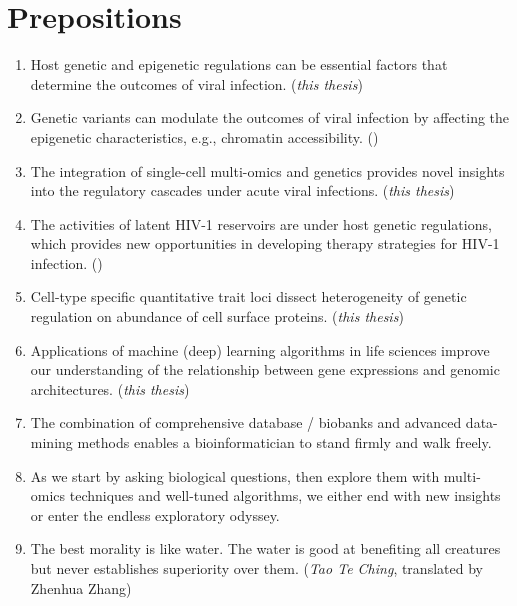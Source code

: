 \documentclass[15pt,usletter,fancy]{src/phdthesis}
\begin{document}
\chapter*{Prepositions}

\begin{enumerate}
  \item Host genetic and epigenetic regulations can be essential factors that determine the outcomes of viral infection. (\textit{this thesis})
  \item Genetic variants can modulate the outcomes of viral infection by affecting the epigenetic characteristics, e.g., chromatin accessibility. ()
  \item The integration of single-cell multi-omics and genetics provides novel insights into the regulatory cascades under acute viral infections. (\textit{this thesis})
  \item The activities of latent HIV-1 reservoirs are under host genetic regulations, which provides new opportunities in developing therapy strategies for HIV-1 infection. ()
  \item Cell-type specific quantitative trait loci dissect heterogeneity of genetic regulation on abundance of cell surface proteins. (\textit{this thesis})
  \item Applications of machine (deep) learning algorithms in life sciences improve our understanding of the relationship between gene expressions and genomic architectures. (\textit{this thesis})
  \item The combination of comprehensive database / biobanks and advanced data-mining methods enables a bioinformatician to stand firmly and walk freely.
  \item As we start by asking biological questions, then explore them with multi-omics techniques and well-tuned algorithms, we either end with new insights or enter the endless exploratory odyssey.
  \item The best morality is like water. The water is good at benefiting all creatures but never establishes superiority over them. (\textit{Tao Te Ching}, translated by Zhenhua Zhang)
\end{enumerate}
\end{document}
